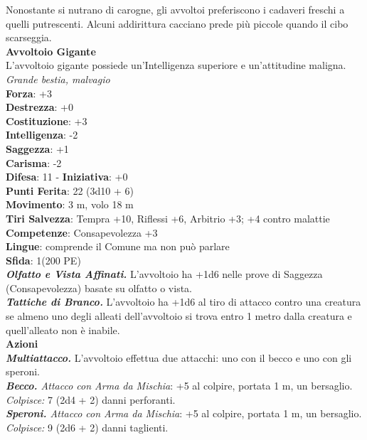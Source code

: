 \begin{multicols}{2}
Nonostante si nutrano di carogne, gli avvoltoi preferiscono i cadaveri freschi a quelli putrescenti. Alcuni addirittura cacciano prede più piccole quando il cibo scarseggia.\\

\medskip\textbf{Avvoltoio Gigante}\\
L'avvoltoio gigante possiede un'Intelligenza superiore e un'attitudine maligna.\\
\emph{Grande bestia, malvagio}\\
\textbf{Forza}: +3\\
\textbf{Destrezza}: +0\\
\textbf{Costituzione}: +3\\
\textbf{Intelligenza}: -2\\
\textbf{Saggezza}: +1\\
\textbf{Carisma}: -2\\
\textbf{Difesa}: 11 - \textbf{Iniziativa}: +0\\
\textbf{Punti Ferita}: 22 (3d10 + 6)\\
\textbf{Movimento}: 3 m, volo 18 m\\
\textbf{Tiri Salvezza}: Tempra +10, Riflessi +6, Arbitrio +3; +4 contro malattie\\
\textbf{Competenze}: Consapevolezza +3\\
\textbf{Lingue}: comprende il Comune ma non può parlare\\
\textbf{Sfida}: 1(200 PE)\smallskip\\
\emph{\textbf{Olfatto e Vista Affinati.}} L'avvoltoio ha +1d6 nelle prove di Saggezza (Consapevolezza) basate su olfatto o vista.\\
\emph{\textbf{Tattiche di Branco.}} L'avvoltoio ha +1d6 al tiro di attacco contro una creatura se almeno uno degli alleati dell'avvoltoio si trova entro 1 metro dalla creatura e quell'alleato non è inabile.\\
\smallskip\textbf{Azioni}\\
\emph{\textbf{Multiattacco.}} L'avvoltoio effettua due attacchi: uno con il becco e uno con gli speroni.\\
\emph{\textbf{Becco.} Attacco con Arma da Mischia}: +5 al colpire, portata 1 m, un bersaglio.\\
\emph{Colpisce:} 7 (2d4 + 2) danni perforanti.\\
\emph{\textbf{Speroni.} Attacco con Arma da Mischia}: +5 al colpire, portata 1 m, un bersaglio.\\
\emph{Colpisce:} 9 (2d6 + 2) danni taglienti.\\

\end{multicols}
